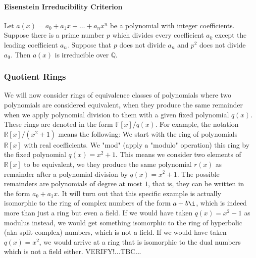 

\paragraph{Eisenstein Irreducibility Criterion}
Let $a(x) = a_0 + a_1 x + \ldots + a_n x^n$ be a polynomial with integer coefficients. Suppose there is a prime number $p$ which divides every coefficient $a_k$ except the leading coefficient $a_n$. Suppose that $p$ does not divide $a_n$ and $p^2$ does not divide $a_0$. Then $a(x)$ is irreducible over $\mathbb{Q}$.




\subsubsection{Quotient Rings}
We will now consider rings of equivalence classes of polynomials where two polynomials are considered equivalent, when they produce the same remainder when we apply polynomial division to them with a given fixed polynomial $q(x)$. These rings are denoted in the form $\mathbb{F}[x] / q(x)$. For example, the notation $\mathbb{R}[x] / (x^2 + 1)$ means the following: We start with the ring of polynomials $\mathbb{R}[x]$ with real coefficients. We "mod" (apply a "modulo" operation) this ring by the fixed polynomial $q(x) = x^2 + 1$. This means we consider two elements of $\mathbb{R}[x]$ to be equivalent, we they produce the same polynomial $r(x)$ as remainder after a polynomial division by $q(x) = x^2 + 1$. The possible remainders are polynomials of degree at most $1$, that is, they can be written in the form $a_0 + a_1 x$. It will turn out that this specific example is actually isomorphic to the ring of complex numbers of the form $a + b \i$, which is indeed more than just a ring but even a field. If we would have taken $q(x) = x^2 - 1$ as modulus instead, we would get something isomorphic to the ring of hyperbolic (aka split-complex) numbers, which is not a field. If we would have taken $q(x) = x^2$, we would arrive at a ring that is isomorphic to the dual numbers which is not a field either.  VERIFY!...TBC...


